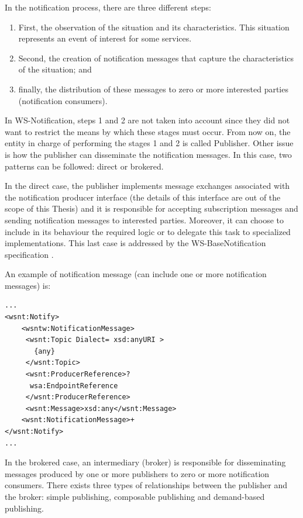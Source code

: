 In the notification process, there are three different steps: 
\begin{enumerate}
\item First, the observation of the situation and its characteristics. This situation represents an event of
interest for some services.
\item Second, the creation of notification messages that capture 
the characteristics of the situation; and
\item finally, the distribution of these messages to zero or more interested parties (notification consumers).
\end{enumerate}
In WS-Notification, steps 1 and 2 are not taken into account 
since they did not want to restrict the means by which
these stages must occur. From now on, the entity in charge of performing the stages 1 and 2 is called Publisher.
Other issue is how the publisher can disseminate the notification messages. 
In this case, two patterns can be followed: direct or brokered.

In the direct case, the publisher implements message exchanges associated with
the notification producer interface (the details of this interface are out of the scope of this Thesis)
and it is responsible for accepting subscription messages and
sending notification messages to interested parties. Moreover, it
can choose to include in its behaviour the required logic or to delegate this task to specialized implementations. 
This last case is addressed by the WS-BaseNotification
specification \cite{}.

An example of notification message (can include one or more notification messages) is:
 
\begin{lstlisting}
...
<wsnt:Notify>
    <wsntw:NotificationMessage>
     <wsnt:Topic Dialect= xsd:anyURI >
       {any}
     </wsnt:Topic>
     <wsnt:ProducerReference>?
      wsa:EndpointReference
     </wsnt:ProducerReference>
     <wsnt:Message>xsd:any</wsnt:Message>
    <wsnt:NotificationMessage>+
</wsnt:Notify>
...
\end{lstlisting}

In the brokered case, an intermediary (broker) is responsible for disseminating
messages produced by one or more publishers to zero
or more notification consumers. There exists three types of relationships between the publisher and the
broker: simple publishing, composable publishing and demand-based publishing.

